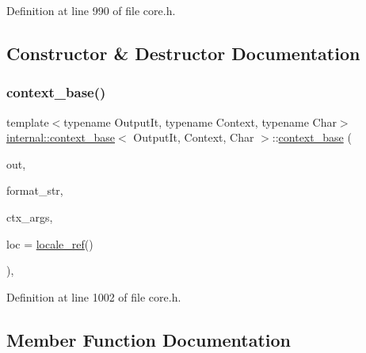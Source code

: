 Definition at line 990 of file core.\+h.



\subsection{Constructor \& Destructor Documentation}
\mbox{\label{classinternal_1_1context__base_adf802ddfa4af4dcc110b82fa298f9e59}} 
\subsubsection{\texorpdfstring{context\+\_\+base()}{context\_base()}}
{\footnotesize\ttfamily template$<$typename Output\+It, typename Context, typename Char$>$ \\
\hyperlink{classinternal_1_1context__base}{internal\+::context\+\_\+base}$<$ Output\+It, Context, Char $>$\+::\hyperlink{classinternal_1_1context__base}{context\+\_\+base} (\begin{DoxyParamCaption}\item[{Output\+It}]{out,  }\item[{\hyperlink{classbasic__string__view}{basic\+\_\+string\+\_\+view}$<$ \hyperlink{classinternal_1_1context__base_a012818dce2cbba8d267491288b9f3f63}{char\+\_\+type} $>$}]{format\+\_\+str,  }\item[{\hyperlink{classbasic__format__args}{basic\+\_\+format\+\_\+args}$<$ Context $>$}]{ctx\+\_\+args,  }\item[{\hyperlink{classinternal_1_1locale__ref}{locale\+\_\+ref}}]{loc = {\ttfamily \hyperlink{classinternal_1_1locale__ref}{locale\+\_\+ref}()} }\end{DoxyParamCaption})\hspace{0.3cm}{\ttfamily [inline]}, {\ttfamily [protected]}}



Definition at line 1002 of file core.\+h.



\subsection{Member Function Documentation}
\mbox{\label{classinternal_1_1context__base_a9b9ce1c9b8d586251ab40312840779c9}} 
